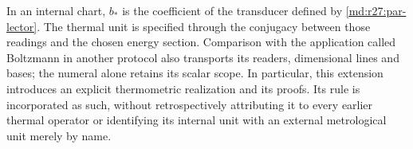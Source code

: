 In an internal chart, $b_*$ is the coefficient of the transducer defined by
\eqref{md:r27:par-lector}. The thermal unit is specified through the conjugacy
between those readings and the chosen energy section. Comparison with the
application called Boltzmann in another protocol also transports its readers,
dimensional lines and bases; the numeral alone retains its scalar scope.
In particular, this extension introduces an explicit thermometric realization
and its proofs. Its rule is incorporated as such, without retrospectively
attributing it to every earlier thermal operator or identifying its internal
unit with an external metrological unit merely by name.
